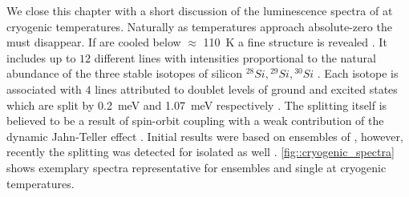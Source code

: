     We close this chapter with a short discussion of the luminescence spectra of \sivs at cryogenic temperatures. Naturally as temperatures approach absolute-zero the \psb must disappear. If \sivs are cooled below $\approx$ \SI{110}{\kelvin} a fine structure is revealed \cite{becker::45}. It includes up to $12$ different lines with intensities proportional to the natural abundance of the three stable isotopes of silicon ${}^{28}Si, {}^{29}Si, {}^{30}Si$ \cite{janine::231}. Each isotope is associated with $4$ lines attributed to doublet levels of ground and excited states which are split by \SI{0.2}{\milli\eV} and \SI{1.07}{\milli\eV} respectively \cite{janine::26, janine::223, janine::231}. The splitting itself is believed to be a result of spin-orbit coupling with a weak contribution of the dynamic Jahn-Teller effect \cite{janine::223}. Initial results were based on ensembles of \sivs, however, recently the splitting was detected for isolated \sivs as well \cite{janine::226}. \autoref{fig::cryogenic_spectra} shows exemplary spectra representative for ensembles and single \siv at cryogenic temperatures.

